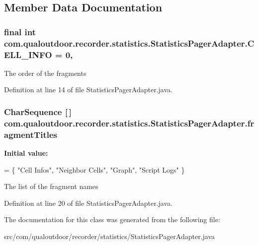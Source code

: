 \subsection{Member Data Documentation}
\hypertarget{classcom_1_1qualoutdoor_1_1recorder_1_1statistics_1_1StatisticsPagerAdapter_ab2945fd8047171f62d7424d3e8c40b9b}{
\subsubsection[{C\-E\-L\-L\-\_\-\-I\-N\-F\-O}]{\setlength{\rightskip}{0pt plus 5cm}final int com.\-qualoutdoor.\-recorder.\-statistics.\-Statistics\-Pager\-Adapter.\-C\-E\-L\-L\-\_\-\-I\-N\-F\-O = 0\hspace{0.3cm}{\ttfamily [static]}, {\ttfamily [private]}}}\label{classcom_1_1qualoutdoor_1_1recorder_1_1statistics_1_1StatisticsPagerAdapter_ab2945fd8047171f62d7424d3e8c40b9b}
The order of the fragments 

Definition at line 14 of file Statistics\-Pager\-Adapter.\-java.

\hypertarget{classcom_1_1qualoutdoor_1_1recorder_1_1statistics_1_1StatisticsPagerAdapter_a1cc9fe41e3f21712e228dfff867910ef}{
\subsubsection[{fragment\-Titles}]{\setlength{\rightskip}{0pt plus 5cm}Char\-Sequence \mbox{[}$\,$\mbox{]} com.\-qualoutdoor.\-recorder.\-statistics.\-Statistics\-Pager\-Adapter.\-fragment\-Titles\hspace{0.3cm}{\ttfamily [private]}}}\label{classcom_1_1qualoutdoor_1_1recorder_1_1statistics_1_1StatisticsPagerAdapter_a1cc9fe41e3f21712e228dfff867910ef}
{\bfseries Initial value\-:}
\begin{DoxyCode}
= \{ \textcolor{stringliteral}{"Cell Infos"}, \textcolor{stringliteral}{"Neighbor Cells"},
            \textcolor{stringliteral}{"Graph"}, \textcolor{stringliteral}{"Script Logs"} \}
\end{DoxyCode}
The list of the fragment names 

Definition at line 20 of file Statistics\-Pager\-Adapter.\-java.



The documentation for this class was generated from the following file\-:\begin{DoxyCompactItemize}
\item 
src/com/qualoutdoor/recorder/statistics/Statistics\-Pager\-Adapter.\-java\end{DoxyCompactItemize}
